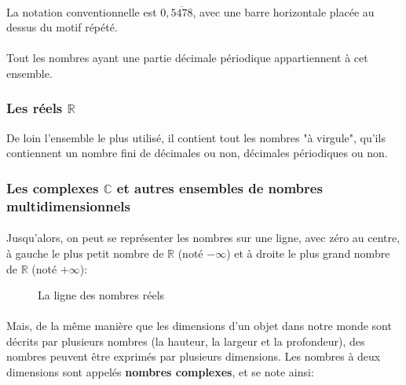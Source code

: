\documentclass[a4paper]{book}
\begin{document}
    \paragraph{}
    La notation conventionnelle est $0,\overline{5478}$, avec une barre horizontale placée au dessus du motif répété.
    \paragraph{}
    Tout les nombres ayant une partie décimale périodique appartiennent à cet ensemble. 
    
    \subsubsection{Les réels $\mathds{R}$}
    De loin l'ensemble le plus utilisé, il contient tout les nombres "à virgule", qu'ils contiennent un nombre fini de décimales ou non, décimales périodiques ou non.
    
    \subsubsection{Les complexes $\mathds{C}$ et autres ensembles de nombres multidimensionnels}
    
    \paragraph{}
    Jusqu'alors, on peut se représenter les nombres sur une ligne, avec zéro au centre, à gauche le plus petit nombre de $\mathds{R}$ (noté $-\infty$) et à droite le plus grand nombre de $\mathds{R}$ (noté $+\infty$):
    
    \begin{figure}[h!]
        \centering
        \caption{La ligne des nombres réels}
        \label{fig:numberline}
    \end{figure}
    
    \paragraph{}
    Mais, de la même manière que les dimensions d'un objet dans notre monde sont décrits par plusieurs nombres (la hauteur, la largeur et la profondeur), des nombres peuvent être exprimés par plusieurs dimensions. Les nombres à deux dimensions sont appelés \textbf{nombres complexes}, et se note ainsi:
    
\end{document}
